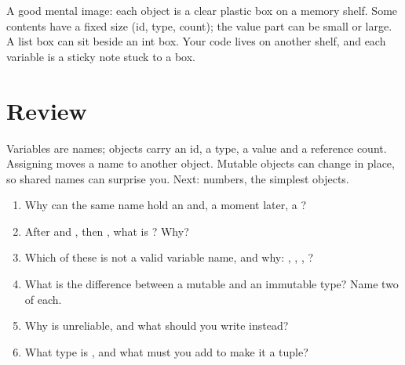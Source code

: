 A good mental image: each object is a clear plastic box on a memory shelf. Some contents
have a fixed size (id, type, count); the value part can be small or large. A
list box can sit beside an int box. Your code lives on another shelf, and each variable is a
sticky note stuck to a box.

\begin{center}
\end{center}

\section{Review}

Variables are names; objects carry an id, a type, a value and a reference count. Assigning
moves a name to another object. Mutable objects can change in place, so shared names can
surprise you. Next: numbers, the simplest objects.

\begin{practice}
\begin{enumerate}[itemsep=1pt]
\item Why can the same name hold an  and, a moment later, a ?
\item After  and , then , what is ? Why?
\item Which of these is not a valid variable name, and why: , , , ?
\item What is the difference between a mutable and an immutable type? Name two of each.
\item Why is  unreliable, and what should you write instead?
\item What type is , and what must you add to make it a tuple?
\end{enumerate}
\end{practice}

